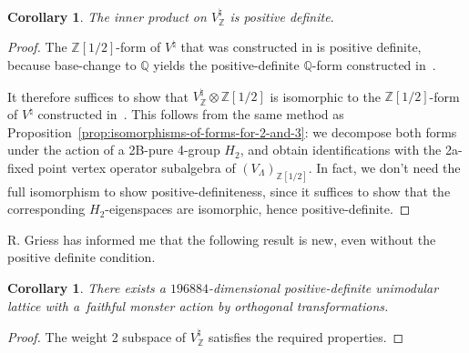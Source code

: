 \documentclass[pdftex]{sigma}
\newcommand{\bQ}{\mathbb{Q}}
\newcommand{\bZ}{\mathbb{Z}}
\newtheorem{cor}[thm]{Corollary}
\theoremstyle{definition}
\begin{document}
\begin{cor}The inner product on $V^\natural_\bZ$ is positive definite.
\end{cor}
\begin{proof}The $\bZ[1/2]$-form of $V^\natural$ that was constructed in \cite{BR96} is positive definite, because base-change to $\bQ$ yields the positive-definite $\bQ$-form constructed in~\cite{FLM88}.

It therefore suffices to show that $V^\natural_\bZ \otimes \bZ[1/2]$ is isomorphic to the $\bZ[1/2]$-form of $V^\natural$ constructed in~\cite{BR96}. This follows from the same method as Proposition~\ref{prop:isomorphisms-of-forms-for-2-and-3}: we decompose both forms under the action of a 2B-pure 4-group $H_2$, and obtain identifications with the 2a-fixed point vertex operator subalgebra of $(V_\Lambda)_{\bZ[1/2]}$. In fact, we don't need the full isomorphism to show positive-definiteness, since it suffices to show that the corresponding $H_2$-eigenspaces are isomorphic, hence positive-definite.
\end{proof}

R. Griess has informed me that the following result is new, even without the positive definite condition.

\begin{cor}There exists a $196884$-dimensional positive-definite unimodular lattice with a~faithful monster action by orthogonal transformations.
\end{cor}
\begin{proof}The weight 2 subspace of $V^\natural_{\bZ}$ satisfies the required properties.
\end{proof}
\end{document}
